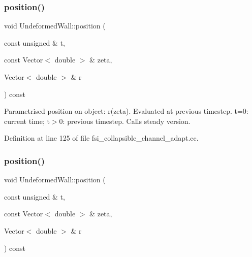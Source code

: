 \mbox{\label{classUndeformedWall_a9cbb52e30fd47d1841c1c3dc812f4b96}} 
\subsubsection{\texorpdfstring{position()}{position()}\hspace{0.1cm}{\footnotesize\ttfamily [3/8]}}
{\footnotesize\ttfamily void Undeformed\+Wall\+::position (\begin{DoxyParamCaption}\item[{const unsigned \&}]{t,  }\item[{const Vector$<$ double $>$ \&}]{zeta,  }\item[{Vector$<$ double $>$ \&}]{r }\end{DoxyParamCaption}) const\hspace{0.3cm}{\ttfamily [inline]}}



Parametrised position on object\+: r(zeta). Evaluated at previous timestep. t=0\+: current time; t$>$0\+: previous timestep. Calls steady version. 



Definition at line 125 of file fsi\+\_\+collapsible\+\_\+channel\+\_\+adapt.\+cc.

\mbox{\label{classUndeformedWall_a9cbb52e30fd47d1841c1c3dc812f4b96}} 
\subsubsection{\texorpdfstring{position()}{position()}\hspace{0.1cm}{\footnotesize\ttfamily [4/8]}}
{\footnotesize\ttfamily void Undeformed\+Wall\+::position (\begin{DoxyParamCaption}\item[{const unsigned \&}]{t,  }\item[{const Vector$<$ double $>$ \&}]{zeta,  }\item[{Vector$<$ double $>$ \&}]{r }\end{DoxyParamCaption}) const\hspace{0.3cm}{\ttfamily [inline]}}



